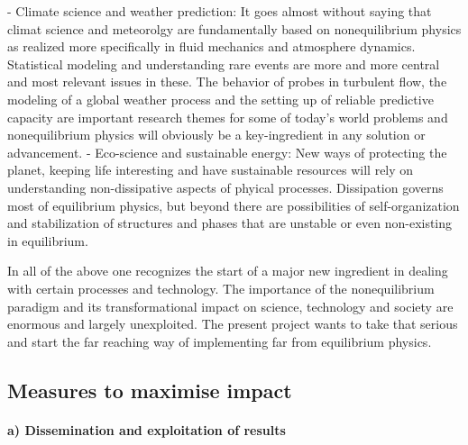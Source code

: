 - Climate science and weather prediction: It goes almost without saying that climat science and meteorolgy are fundamentally based on nonequilibrium physics as realized more specifically in fluid mechanics and atmosphere dynamics. Statistical modeling and understanding rare events are more and more central and most relevant issues in these. The behavior of probes in turbulent flow, the modeling of a global weather process and the setting up of reliable predictive capacity  are important research themes for some of today's world problems and nonequilibrium physics will obviously be a key-ingredient in any solution or advancement. 
- Eco-science and sustainable energy: New ways of protecting the planet, keeping life interesting and have sustainable resources will rely on understanding non-dissipative aspects of phyical processes.  Dissipation governs most of equilibrium physics, but beyond there are possibilities of self-organization and stabilization of structures and phases that are unstable or even non-existing in equilibrium.  

In all of the above one recognizes the start of a major new ingredient in dealing with certain processes and technology.  The importance of the nonequilibrium paradigm and its transformational impact on science, technology and society are enormous and largely unexploited.  The present project wants to take that serious and start the far reaching way of implementing far from equilibrium physics.




\subsection{Measures to maximise impact}

\paragraph{a) Dissemination and exploitation of results}

